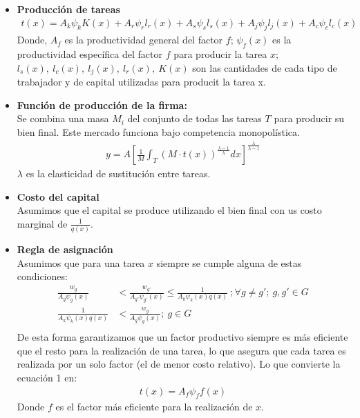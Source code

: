 \documentclass{article}
\theoremstyle{remark}
\theoremstyle{definition}
\begin{document}
\begin{itemize}
    \item \textbf{Producci\'on de tareas}
    \begin{align}
        t(x) =A_{k}\psi_{k}K(x) +A_{r}\psi_{r}l_{r}(x)+A_{s}\psi_{s}l_{s}(x)+A_{j}\psi_{j}l_{j}(x)+A_{c}\psi_{c}l_{c}(x)
    \end{align}
    Donde, $A_{f}$ es la productividad general del factor $f$; $\psi_{f}(x)$ es la productividad espec\'ifica del factor $f$ para producir la tarea $x$; $l_{s}(x), \ l_{c}(x), \ l_{j}(x), \ l_{r}(x), \ K(x)$ son las cantidades de cada tipo de trabajador y de capital utilizadas para producit la tarea x.
    \item \textbf{Funci\'on de producci\'on de la firma:} \\
    Se combina una masa $M_i$ del conjunto de todas las tareas $T$ para producir su bien final. Este mercado funciona bajo competencia monopol\'istica.
    \begin{align*}
        y = A \left[ \frac{1}{M} \int_{T} \left( M \cdot t(x) \right) ^ {\frac{\lambda -1}{\lambda}} dx \right] ^ {\frac{\lambda}{\lambda -1}}
    \end{align*}
    $\lambda$ es la elasticidad de sustituci\'on entre tareas.
    \item \textbf{Costo del capital} \\
    Asumimos que el capital se produce utilizando el bien final con us costo marginal de $\frac{1}{q(x)}$.
    \item \textbf{Regla de asignaci\'on} \\
    Asumimos que para una tarea $x$ siempre se cumple alguna de estas condiciones:
    \begin{align*}
        \frac{w_{g}}{A_{g}\psi_{g}(x)} &< \frac{w_{g'}}{A_{g'}\psi_{g'}(x)} \leq \frac{1}{A_{k}\psi_{k}(x)q(x)} \ ; \forall g \neq g'; \ g,g' \in G \\
        \frac{1}{A_{k}\psi_{k}(x)q(x)} &< \frac{w_{g}}{A_{g}\psi_{g}(x)}; \ g\in G \\
    \end{align*}
    De esta forma garantizamos que un factor productivo siempre es m\'as eficiente que el resto para la realizaci\'on de una tarea, lo que asegura que cada tarea es realizada por un solo factor (el de menor costo relativo). Lo que convierte la ecuaci\'on 1 en:
    \begin{align}
        t(x) =A_{f}\psi_{f}f(x)
    \end{align}
    Donde $f$ es el factor m\'as eficiente para la realizaci\'on de $x$. \\


\end{itemize}
\end{document}
